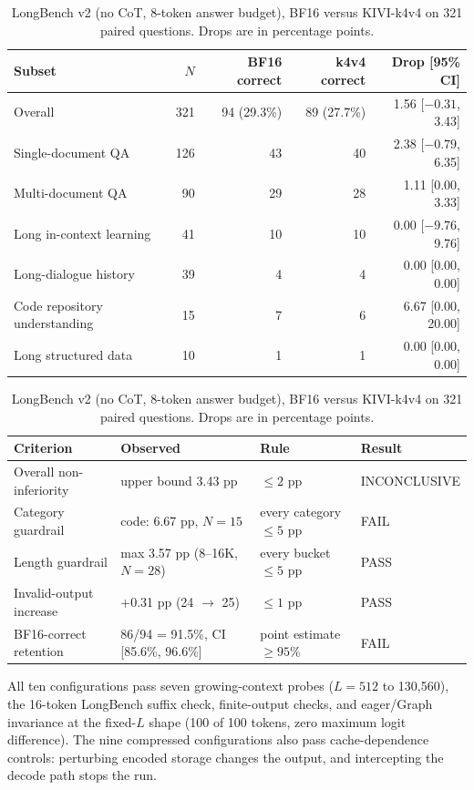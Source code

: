 \documentclass{article}
\begin{document}
\begin{table}[t]
\caption{LongBench v2 (no CoT, 8-token answer budget), BF16 versus KIVI-k4v4 on 321 paired questions.
Drops are in percentage points.}
\label{tab:lbv2}
\vskip 0.1in
\centering
\small
\begin{tabular}{@{}lrrrr@{}}
\toprule
Subset & $N$ & BF16 correct & k4v4 correct & Drop [95\% CI] \\
\midrule
Overall & 321 & 94 (29.3\%) & 89 (27.7\%) & 1.56 [$-0.31$, 3.43] \\
Single-document QA & 126 & 43 & 40 & 2.38 [$-0.79$, 6.35] \\
Multi-document QA & 90 & 29 & 28 & 1.11 [0.00, 3.33] \\
Long in-context learning & 41 & 10 & 10 & 0.00 [$-9.76$, 9.76] \\
Long-dialogue history & 39 & 4 & 4 & 0.00 [0.00, 0.00] \\
Code repository understanding & 15 & 7 & 6 & 6.67 [0.00, 20.00] \\
Long structured data & 10 & 1 & 1 & 0.00 [0.00, 0.00] \\
\bottomrule
\end{tabular}

\vskip 0.12in
\begin{tabular}{@{}llll@{}}
\toprule
Criterion & Observed & Rule & Result \\
\midrule
Overall non-inferiority & upper bound 3.43 pp & $\leq 2$ pp & INCONCLUSIVE \\
Category guardrail & code: 6.67 pp, $N = 15$ & every category $\leq 5$ pp & FAIL \\
Length guardrail & max 3.57 pp (8--16K, $N = 28$) & every bucket $\leq 5$ pp & PASS \\
Invalid-output increase & +0.31 pp (24 $\rightarrow$ 25) & $\leq 1$ pp & PASS \\
BF16-correct retention & 86/94 = 91.5\%, CI [85.6\%, 96.6\%] & point estimate $\geq 95\%$ & FAIL \\
\bottomrule
\end{tabular}
\end{table}

All ten configurations pass seven growing-context probes ($L = 512$ to 130,560), the 16-token LongBench suffix check, finite-output checks, and eager/Graph invariance at the fixed-$L$ shape (100 of 100 tokens, zero maximum logit difference).
The nine compressed configurations also pass cache-dependence controls: perturbing encoded storage changes the output, and intercepting the decode path stops the run.
\end{document}
